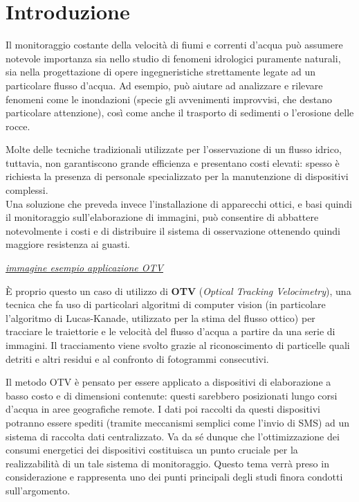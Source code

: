 \chapter*{Introduzione}

Il monitoraggio costante della velocità di fiumi e correnti d'acqua può assumere notevole importanza sia nello studio di 
fenomeni idrologici puramente naturali, sia nella progettazione di opere ingegneristiche strettamente legate ad un 
particolare flusso d'acqua. Ad esempio, può aiutare ad analizzare e rilevare fenomeni come le inondazioni (specie gli 
avvenimenti improvvisi, che destano particolare attenzione), così come anche il trasporto di sedimenti o 
l'erosione delle rocce.

Molte delle tecniche tradizionali utilizzate per l'osservazione di un flusso idrico, tuttavia, non garantiscono 
grande efficienza e presentano costi elevati: spesso è richiesta la presenza di personale specializzato per la 
manutenzione di dispositivi complessi.\cite{rs10122010}\\ %
Una soluzione che preveda invece l'installazione di apparecchi ottici, e basi quindi il monitoraggio sull'elaborazione di
immagini, può consentire di abbattere notevolmente i costi e di distribuire il sistema di osservazione ottenendo quindi 
maggiore resistenza ai guasti.%

\textit{\underline{immagine esempio applicazione OTV}}

È proprio questo un caso di utilizzo di \textbf{OTV} (\textit{Optical Tracking Velocimetry}), una tecnica che fa uso di 
particolari algoritmi di computer vision (in particolare l'algoritmo di Lucas-Kanade, utilizzato per la stima del flusso 
ottico) per tracciare le traiettorie e le velocità del flusso d'acqua a partire da una serie di immagini. 
Il tracciamento viene svolto grazie al riconoscimento di particelle quali detriti e altri residui e al confronto di fotogrammi 
consecutivi.

Il metodo OTV è pensato per essere applicato a dispositivi di elaborazione a basso costo e di dimensioni contenute: questi
sarebbero posizionati lungo corsi d'acqua in aree geografiche remote. I dati poi raccolti da questi dispositivi potranno essere
spediti (tramite meccanismi semplici come l'invio di SMS) ad un sistema di raccolta dati centralizzato.
Va da sé dunque che l'ottimizzazione dei consumi energetici dei dispositivi costituisca un punto cruciale per la 
realizzabilità di un tale sistema di monitoraggio. Questo tema verrà preso in considerazione e rappresenta uno dei punti
principali degli studi finora condotti sull'argomento.\\

